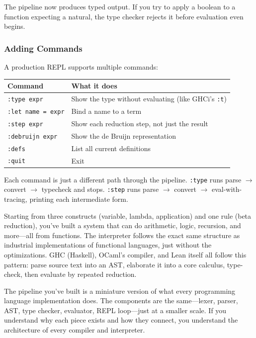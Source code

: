 \documentclass[11pt,a4paper]{article}
\theoremstyle{definition}
\begin{document}
The pipeline now produces typed output. If you try to apply a boolean to a
function expecting a natural, the type checker rejects it before evaluation
even begins.

\subsubsection{Adding Commands}

A production REPL supports multiple commands:

\begin{center}
\renewcommand{\arraystretch}{1.4}
\begin{tabular}{lp{8cm}}
\textbf{Command} & \textbf{What it does} \\
\hline
\texttt{:type expr} & Show the type without evaluating (like GHCi's
  \texttt{:t}) \\
\texttt{:let name = expr} & Bind a name to a term \\
\texttt{:step expr} & Show each reduction step, not just the result \\
\texttt{:debruijn expr} & Show the de Bruijn representation \\
\texttt{:defs} & List all current definitions \\
\texttt{:quit} & Exit \\
\end{tabular}
\end{center}

Each command is just a different path through the pipeline. \texttt{:type} runs
parse $\to$ convert $\to$ typecheck and stops. \texttt{:step} runs parse $\to$
convert $\to$ eval-with-tracing, printing each intermediate form.

\begin{intuition}
Starting from three constructs (variable, lambda, application) and one rule
(beta reduction), you've built a system that can do arithmetic, logic,
recursion, and more---all from functions. The interpreter follows the exact
same structure as industrial implementations of functional languages, just
without the optimizations. GHC (Haskell), OCaml's compiler, and Lean itself
all follow this pattern: parse source text into an AST, elaborate it
into a core calculus, type-check, then evaluate by repeated reduction.

The pipeline you've built is a miniature version of what every programming
language implementation does. The components are the same---lexer, parser,
AST, type checker, evaluator, REPL loop---just at a smaller scale. If you
understand why each piece exists and how they connect, you understand the
architecture of every compiler and interpreter.
\end{intuition}
\end{document}
